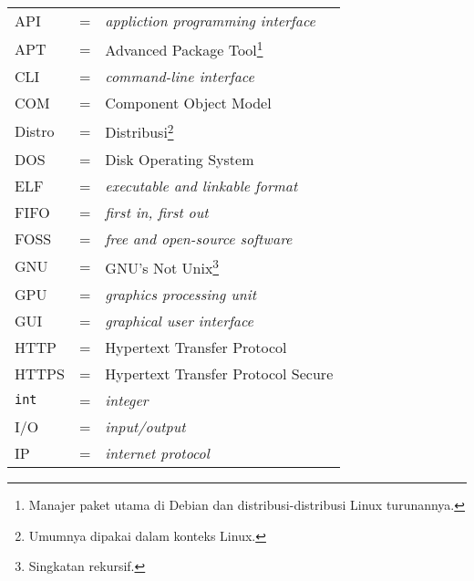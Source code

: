 \begin{longtable}{llp{3in}}
    API & \hspace{1.5cm} = & \textit{appliction programming interface}\\
    APT & \hspace{1.5cm} = & Advanced Package Tool\footnote{Manajer paket utama di Debian dan distribusi-distribusi Linux turunannya.}\\
    CLI & \hspace{1.5cm} = & \textit{command-line interface}\\
    COM & \hspace{1.5cm} = & Component Object Model\\
    Distro & \hspace{1.5cm} = & Distribusi\footnote{Umumnya dipakai dalam konteks Linux.}\\
    DOS & \hspace{1.5cm} = & Disk Operating System\\
    ELF & \hspace{1.5cm} = & \textit{executable and linkable format}\\
    FIFO & \hspace{1.5cm} = & \textit{first in, first out}\\
    FOSS & \hspace{1.5cm} = & \textit{free and open-source software}\\
    GNU & \hspace{1.5cm} = & GNU's Not Unix\footnote{Singkatan rekursif.}\\
    GPU & \hspace{1.5cm} = & \textit{graphics processing unit}\\
    GUI & \hspace{1.5cm} = & \textit{graphical user interface}\\
    HTTP & \hspace{1.5cm} = & Hypertext Transfer Protocol\\
    HTTPS & \hspace{1.5cm} = & Hypertext Transfer Protocol Secure\\
    \verb|int| & \hspace{1.5cm} = & \textit{integer}\\
    I/O & \hspace{1.5cm} = & \textit{input/output}\\
    IP & \hspace{1.5cm} = & \textit{internet protocol}\\

\end{longtable}
